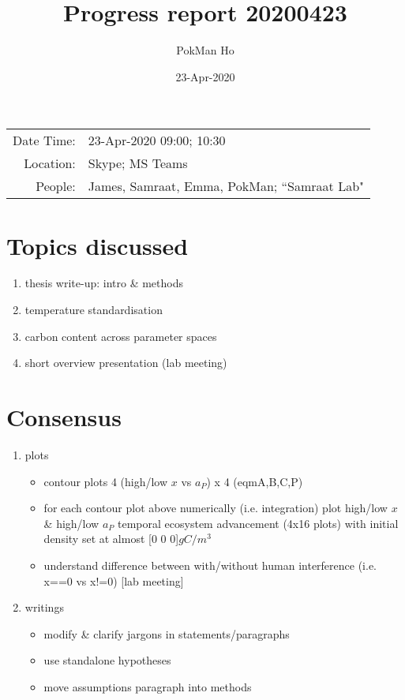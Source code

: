 \documentclass[a4paper,11pt]{article}
\title{Progress report 20200423}
\author{PokMan Ho}
\date{23-Apr-2020}
\begin{document}
    \maketitle
    
    \begin{tabular}{rl}
        Date Time: & 23-Apr-2020 09:00; 10:30 \\
        Location: & Skype; MS Teams \\
        People: & James, Samraat, Emma, PokMan; ``Samraat Lab" \\
    \end{tabular}
    
    \section{Topics discussed}
    \begin{enumerate}
        \item thesis write-up: intro \& methods
        \item temperature standardisation
        \item carbon content across parameter spaces
        \item short overview presentation (lab meeting)
    \end{enumerate}
    
    \section{Consensus}
    \begin{enumerate}
        \item plots
        \begin{itemize}
            \item contour plots 4 (high/low $x$ vs $a_P$) x 4 (eqmA,B,C,P)
            \item for each contour plot above numerically (i.e. integration) plot high/low $x$ \& high/low $a_P$ temporal ecosystem advancement (4x16 plots) with initial density set at almost [0 0 0]$gC/m^3$
            \item understand difference between with/without human interference (i.e. x==0 vs x!=0) [lab meeting]
        \end{itemize}
        \item writings
        \begin{itemize}
            \item modify \& clarify jargons in statements/paragraphs
            \item use standalone hypotheses
            \item move assumptions paragraph into methods
        \end{itemize}
    \end{enumerate}
\end{document}
